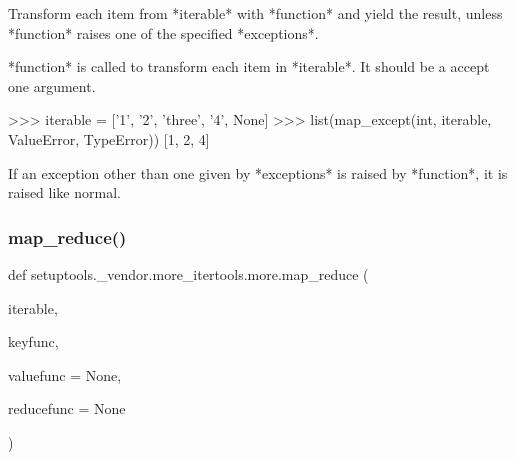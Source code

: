 \begin{DoxyVerb}Transform each item from *iterable* with *function* and yield the
result, unless *function* raises one of the specified *exceptions*.

*function* is called to transform each item in *iterable*.
It should be a accept one argument.

>>> iterable = ['1', '2', 'three', '4', None]
>>> list(map_except(int, iterable, ValueError, TypeError))
[1, 2, 4]

If an exception other than one given by *exceptions* is raised by
*function*, it is raised like normal.
\end{DoxyVerb}
 \mbox{\label{namespacesetuptools_1_1__vendor_1_1more__itertools_1_1more_aeb75e076a0e72311a8a333fa52b1c4c8}} 
\subsubsection{\texorpdfstring{map\+\_\+reduce()}{map\_reduce()}}
{\footnotesize\ttfamily def setuptools.\+\_\+vendor.\+more\+\_\+itertools.\+more.\+map\+\_\+reduce (\begin{DoxyParamCaption}\item[{}]{iterable,  }\item[{}]{keyfunc,  }\item[{}]{valuefunc = {\ttfamily None},  }\item[{}]{reducefunc = {\ttfamily None} }\end{DoxyParamCaption})}


